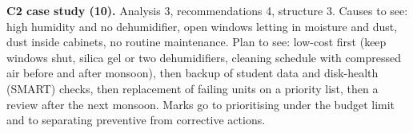 \documentclass[11pt,a4paper]{article}
\begin{document}
\textbf{C2 case study (10).} Analysis 3, recommendations 4, structure 3.
Causes to see: high humidity and no dehumidifier, open windows letting in moisture and dust, dust inside cabinets, no routine maintenance.
Plan to see: low-cost first (keep windows shut, silica gel or two dehumidifiers, cleaning schedule with compressed air before and after monsoon),
then backup of student data and disk-health (SMART) checks, then replacement of failing units on a priority list, then a review after the next monsoon.
Marks go to prioritising under the budget limit and to separating preventive from corrective actions.
\end{document}
